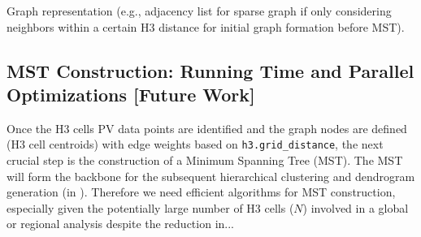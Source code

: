 \begin{multicols}{2}
Graph representation (e.g., adjacency list for sparse graph if only considering neighbors within a certain H3 distance for initial graph formation before MST).

\subsection{MST Construction: Running Time and Parallel Optimizations [Future Work]}

\label{subsec:mst_construction}

Once the H3 cells PV data points are identified and the graph nodes are defined (H3 cell centroids) with edge weights based on \texttt{h3.grid\_distance}, the next crucial step is the construction of a Minimum Spanning Tree (MST). The MST will form the backbone for the subsequent hierarchical clustering and dendrogram generation (in \cite{Wang_Yu_Gu_Shun_2021}). Therefore we need efficient algorithms for MST construction, especially given the potentially large number of H3 cells ($N$) involved in a global or regional analysis despite the reduction in...




\end{multicols}
